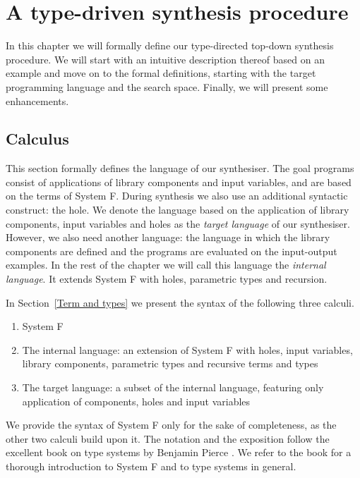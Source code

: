 \lstset{style=plain}

\chapter{A type-driven synthesis procedure} \label{ch:definitions}

In this chapter we will formally define our type-directed top-down synthesis procedure. We will start with an intuitive description thereof based on an example and move on to the formal definitions, starting with the target programming language and the search space. Finally, we will present some enhancements.


 
\section{Calculus}

This section formally defines the language of our synthesiser. The goal programs consist of applications of library components and input variables, and are based on the terms of System F. During synthesis we also use an additional syntactic construct: the hole. We denote the language based on the application of library components, input variables and holes as the \emph{target language} of our synthesiser.
However, we also need another language: the language in which the library components are defined and the programs are evaluated on the input-output examples. In the rest of the chapter we will call this language the \emph{internal language}. It extends System F with holes, parametric types and recursion.

In Section~\ref{Term and types} we present the syntax of the following three calculi.
\begin{enumerate}[1.]
\item System F
\item The internal language: an extension of System F with holes, input variables, library components, parametric types and recursive terms and types
\item The target language: a subset of the internal language, featuring only application of components, holes and input variables
\end{enumerate}
We provide the syntax of System F only for the sake of completeness, as the other two calculi build upon it. The notation and the exposition follow the excellent book on type systems by Benjamin Pierce \cite{pierce2002types}. We refer to the book for a thorough introduction to System F and to type systems in general.

